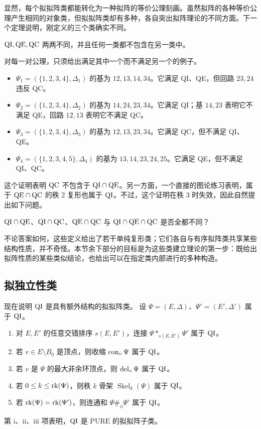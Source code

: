 显然，每个拟拟阵类都能转化为一种拟阵的等价公理刻画。虽然拟阵的各种等价公理产生相同的对象类，但拟拟阵类却有多种，各自突出拟阵理论的不同方面。下一个定理说明，刚定义的三个类确实不同。

$\mathrm{QI},\mathrm{QE},\mathrm{QC}$ 两两不同，并且任何一类都不包含在另一类中。
\begin{proofcn}
对每一对公理，只须给出满足其中一个而不满足另一个的例子。
\begin{itemize}
\item $\Psi_1=(\{1,2,3,4\},\Delta_1)$ 的基为 $12,13,14,34$。它满足 QI、QE，但回路 $23,24$ 违反 QC。
\item $\Psi_2=(\{1,2,3,4\},\Delta_2)$ 的基为 $14,24,23,34$。它满足 QI；基 $14,23$ 表明它不满足 QE，回路 $12,13$ 表明它不满足 QC。
\item $\Psi_3=(\{1,2,3,4\},\Delta_3)$ 的基为 $12,13,23,34$。它满足 QC，但不满足 QI、QE。
\item $\Psi_4=(\{1,2,3,4,5\},\Delta_4)$ 的基为 $13,14,23,24,25$。它满足 QE，但不满足 QI、QC。
\end{itemize}
\end{proofcn}

这个证明表明 $\mathrm{QC}$ 不包含于 $\mathrm{QI}\cap\mathrm{QE}$。另一方面，一个直接的图论练习表明，属于 $\mathrm{QE}\cap\mathrm{QC}$ 的秩 2 复形也属于 $\mathrm{QI}$。不过，这个证明在秩 3 时失效，因此自然提出如下问题。

$\mathrm{QI}\cap\mathrm{QE}$、$\mathrm{QI}\cap\mathrm{QC}$、$\mathrm{QE}\cap\mathrm{QC}$ 与 $\mathrm{QI}\cap\mathrm{QE}\cap\mathrm{QC}$ 是否全都不同？

不论答案如何，这些定义给出了若干单纯复形类；它们各自与有序拟阵类共享某些结构性质，并不奇怪。本节余下部分的目标是为这些类建立理论的第一步：既给出拟阵性质的某些类似结论，也给出可以在指定类内部进行的多种构造。

\subsection{拟独立性类}
现在说明 $\mathrm{QI}$ 是具有额外结构的拟拟阵类。
设 $\Psi=(E,\Delta)$、$\Psi'=(E',\Delta')$ 属于 $\mathrm{QI}$。
\begin{enumerate}[label=\roman*.]
\item 对 $E,E'$ 的任意交错排序 $s(E,E')$，连接 $\Psi*_{s(E,E')}\Psi'$ 属于 $\mathrm{QI}$。
\item 若 $v\in E\setminus B_0$ 是顶点，则收缩 $\operatorname{con}_v\Psi$ 属于 $\mathrm{QI}$。
\item 若 $v$ 是 $\Psi$ 的最大非余环顶点，则 $\operatorname{del}_v\Psi$ 属于 $\mathrm{QI}$。
\item 若 $0\le k\le\operatorname{rk}(\Psi)$，则秩 $k$ 骨架 $\operatorname{Skel}_k(\Psi)$ 属于 $\mathrm{QI}$。
\item 若 $\operatorname{rk}(\Psi)=\operatorname{rk}(\Psi')$，则连通和 $\Psi\#_\phi\Psi'$ 属于 $\mathrm{QI}$。
\end{enumerate}
第 i、ii、iii 项表明，$\mathrm{QI}$ 是 $\mathrm{PURE}$ 的拟拟阵子类。


